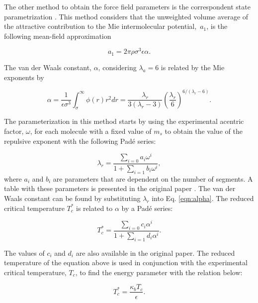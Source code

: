 The other method to obtain the force field parameters is the correspondent state parametrization \cite{mejia2014}. This method considers that the unweighted volume average of the attractive contribution to the Mie intermolecular potential, $ \, a_{1}$, is the following mean-field approximation

\begin{equation}
a_{1} = 2\pi\rho\sigma^{3}\epsilon\alpha .
\label{eqn:a1corres}
\end{equation}

The van der Waals constant, $\alpha$, considering $ \lambda_{a} = 6$ is related by the Mie exponents by

\begin{equation}
\alpha = \frac{1}{\epsilon\sigma^{3    }} \int_{\sigma}^{\infty} \phi(r)r^{2}dr = \frac{\lambda_{r}}{3(\lambda_{r}-3)}\left(\frac{\lambda_r}{6}\right)^{6/(\lambda_{r} - 6)}  .
\label{eqn:alpha}
\end{equation}

The parameterization in this method starts by using the experimental acentric factor, $\omega$, for each molecule with a fixed value of $ m_{s}$ to obtain the value of the repulsive exponent with the following Padé series:

\begin{equation}
\lambda_{r} = \frac{\sum_{i=0} a_{i}\omega^{i}}{1+\sum_{i=1} b_{i}\omega^{i}} ,  
\label{eqn:lambdaco}
\end{equation}
where $a_{i}$ and $b_{i}$ are parameters that are dependent on the number of segments. A table with these parameters is presented in the original paper \cite{mejia2014}. The van der Waals constant can be found by substituting $\lambda_{r}$ into Eq. \eqref{eqn:alpha}. The reduced critical temperature $T_{c}^{*}$ is related to $\alpha$ by a Padé series: 

\begin{equation}
T_{c}^{*} = \frac{\sum_{i=0} c_{i}\alpha^{i}}{1+\sum_{i=1} d_{i}\alpha^{i}}   .
\label{eqn:tc}
\end{equation}

The values of $c_{i}$ and $d_{i}$ are also available in the original paper. The reduced temperature of the equation above is used in conjunction with the experimental critical temperature, $ T_{c}$, to find the energy parameter with the relation below:

\begin{equation}
T_{c}^{*} = \frac{\kappa_{b}T_{c}}{\epsilon}   .
\label{eqn:epscorre}
\end{equation}

